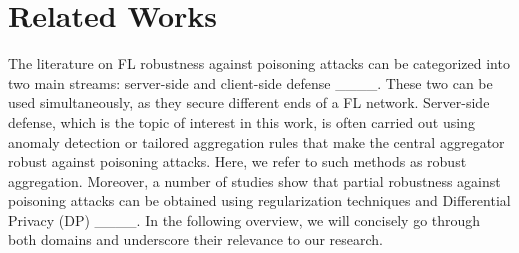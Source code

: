 \section{Related Works}
\label{sec:related_work}
The literature on FL robustness against poisoning attacks can be categorized into two main streams: server-side and client-side defense ____. These two can be used simultaneously, as they secure different ends of a FL network. Server-side defense, which is the topic of interest in this work, is often carried out using anomaly detection or tailored aggregation rules that make the central aggregator robust against poisoning attacks. Here, we refer to such methods as robust aggregation. Moreover, a number of studies show that partial robustness against poisoning attacks can be obtained using regularization techniques and Differential Privacy (DP) ____.
In the following overview, we will concisely go through both domains and underscore their relevance to our research.





